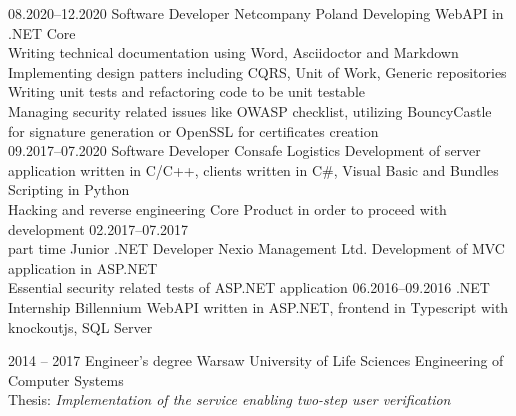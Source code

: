 \documentclass[9pt]{developercv} %
\begin{document}
\begin{entrylist}
	\entry
		{08.2020--12.2020}
		{Software Developer}
		{Netcompany Poland}
		{
		  Developing WebAPI in .NET Core\\
		  Writing technical documentation using Word, Asciidoctor and Markdown\\
		  Implementing design patters including CQRS, Unit of Work, Generic repositories\\
		  Writing unit tests and refactoring code to be unit testable\\
		  Managing security related issues like OWASP checklist, utilizing BouncyCastle for signature generation or OpenSSL for certificates creation\\
		}
	\entry
		{09.2017--07.2020}
		{Software Developer}
		{Consafe Logistics}
		{
		  Development of server application written in C/C++, clients written in C\#, Visual Basic and Bundles\\
		  Scripting in Python\\
		  Hacking and reverse engineering Core Product in order to proceed with development
		}
	\entry
		{02.2017--07.2017\\\footnotesize{part time}}
		{Junior .NET Developer}
		{Nexio Management Ltd.}
		{
		  Development of MVC application in ASP.NET\\
		  Essential security related tests of ASP.NET application
		}
	\entry
		{06.2016--09.2016}
		{.NET Internship}
		{Billennium}
		{
		  WebAPI written in ASP.NET, frontend in Typescript with knockoutjs, SQL Server
		}

\end{entrylist}



\begin{entrylist}
	\entry
		{2014 -- 2017}
		{Engineer’s degree}
		{Warsaw University of Life Sciences}
		{
			Engineering of Computer Systems\\
			Thesis: \it{Implementation of the service enabling two-step user verification}
		}
\end{entrylist}

\end{document}
